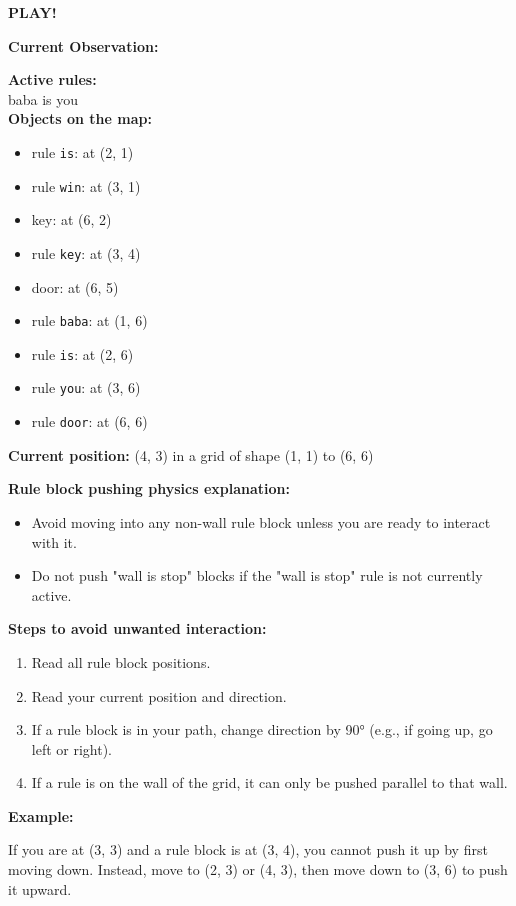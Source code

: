 \begin{GreenBox}[frametitle={\textbf{Iteration 3 Baba-is-ai Prompt}}]
\textbf{PLAY!}

\textbf{Current Observation:}

\textbf{Active rules:} \\
baba is you \\

\textbf{Objects on the map:}
\begin{itemize}
    \item rule \texttt{is}: at (2, 1)
    \item rule \texttt{win}: at (3, 1)
    \item key: at (6, 2)
    \item rule \texttt{key}: at (3, 4)
    \item door: at (6, 5)
    \item rule \texttt{baba}: at (1, 6)
    \item rule \texttt{is}: at (2, 6)
    \item rule \texttt{you}: at (3, 6)
    \item rule \texttt{door}: at (6, 6)
\end{itemize}

\textbf{Current position:} (4, 3) in a grid of shape (1, 1) to (6, 6)

\textbf{Rule block pushing physics explanation:}

\begin{itemize}
    \item Avoid moving into any non-wall rule block unless you are ready to interact with it.
    \item Do not push "wall is stop" blocks if the "wall is stop" rule is not currently active.
\end{itemize}

\textbf{Steps to avoid unwanted interaction:}
\begin{enumerate}
    \item Read all rule block positions.
    \item Read your current position and direction.
    \item If a rule block is in your path, change direction by 90° (e.g., if going up, go left or right).
    \item If a rule is on the wall of the grid, it can only be pushed parallel to that wall.
\end{enumerate}

\textbf{Example:}

If you are at (3, 3) and a rule block is at (3, 4), you cannot push it up by first moving down. Instead, move to (2, 3) or (4, 3), then move down to (3, 6) to push it upward.


\end{GreenBox}
